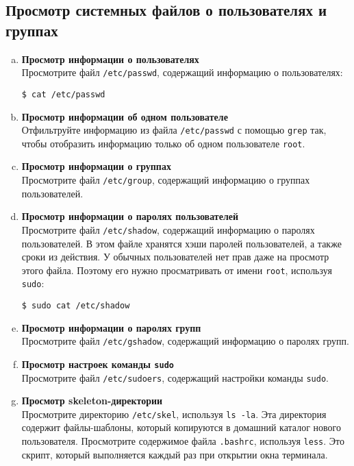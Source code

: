 \documentclass{article}
\begin{document}
\subsection{Просмотр системных файлов о пользователях и группах}
\begin{enumerate}[a.]
\item \textbf{Просмотр информации о пользователях}\\
Просмотрите файл \texttt{/etc/passwd}, содержащий информацию о пользователях:
\begin{lstlisting}
$ cat /etc/passwd
\end{lstlisting}
\item \textbf{Просмотр информации об одном пользователе}\\
Отфильтруйте информацию из файла \texttt{/etc/passwd} с помощью \texttt{grep} так, чтобы отобразить информацию только об одном пользователе \texttt{root}.

\item \textbf{Просмотр информации о группах}\\
Просмотрите файл \texttt{/etc/group}, содержащий информацию о группах пользователей.

\item \textbf{Просмотр информации о паролях пользователей}\\
Просмотрите файл \texttt{/etc/shadow}, содержащий информацию о паролях пользователей. В этом файле хранятся хэши паролей пользователей, а также сроки из действия.
У обычных пользователей нет прав даже на просмотр этого файла.
Поэтому его нужно просматривать от имени \texttt{root}, используя \texttt{sudo}:
\begin{lstlisting}
$ sudo cat /etc/shadow
\end{lstlisting}

\item \textbf{Просмотр информации о паролях групп}\\
Просмотрите файл \texttt{/etc/gshadow}, содержащий информацию о паролях групп.

\item \textbf{Просмотр настроек команды \texttt{sudo}}\\
Просмотрите файл \texttt{/etc/sudoers}, содержащий настройки команды \texttt{sudo}.

\item \textbf{Просмотр skeleton-директории}\\
Просмотрите директорию \texttt{/etc/skel}, используя \texttt{ls -la}. Эта директория содержит файлы-шаблоны, который копируются в домашний каталог нового пользователя. Просмотрите содержимое файла \texttt{.bashrc}, используя \texttt{less}. Это скрипт, который выполняется каждый раз при открытии окна терминала.


\end{enumerate}
\end{document}
